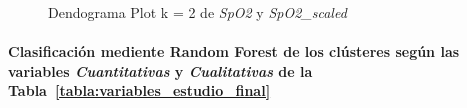 \begin{figure}[ht]
    \centering
    \hfill
    \caption{Dendograma Plot k = 2 de \textit{SpO2} y \textit{SpO2\_scaled}}\label{fig:raw_data_ctg_spo2}
\end{figure}

\paragraph{Clasificación mediente Random Forest de los clústeres según las variables \textit{Cuantitativas} y \textit{Cualitativas} de la Tabla~\ref{tabla:variables_estudio_final}}

